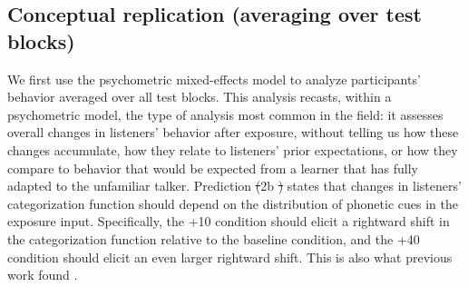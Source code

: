 \documentclass[
  11pt,
  man,mask,floatsintext]{apa6}
\makeatletter
\providecommand{\DIFdel}[1]{{\protect\color{red}\sout{#1}}} %
\providecommand{\DIFdelbegin}{} %
\providecommand{\DIFdelend}{} %
\newcommand{\DIFscaledelfig}{0.5}
\newlength{\DIFdelgraphicswidth} %
\newlength{\DIFdelgraphicsheight} %
\newcommand{\DIFdelincludegraphics}[2][]{%
\sbox{\DIFdelgraphicsbox}{\DIFOincludegraphics[#1]{#2}}%
\settoboxwidth{\DIFdelgraphicswidth}{\DIFdelgraphicsbox} %
\settoboxtotalheight{\DIFdelgraphicsheight}{\DIFdelgraphicsbox} %
\scalebox{\DIFscaledelfig}{%
\parbox[b]{\DIFdelgraphicswidth}{\usebox{\DIFdelgraphicsbox}\\[-\baselineskip] \rule{\DIFdelgraphicswidth}{0em}}\llap{\resizebox{\DIFdelgraphicswidth}{\DIFdelgraphicsheight}{%
\setlength{\unitlength}{\DIFdelgraphicswidth}%
\begin{picture}(1,1)%
\thicklines\linethickness{2pt} %
{\color[rgb]{1,0,0}\put(0,0){\framebox(1,1){}}}%
{\color[rgb]{1,0,0}\put(0,0){\line( 1,1){1}}}%
{\color[rgb]{1,0,0}\put(0,1){\line(1,-1){1}}}%
\end{picture}%
}\hspace*{3pt}}} %
} %
\DeclareRobustCommand{\DIFdelbegin}{\DIFOdelbegin \let\includegraphics\DIFdelincludegraphics} %
\DeclareRobustCommand{\DIFdelend}{\DIFOaddend \let\includegraphics\DIFOincludegraphics} %
\let\sout@orig\sout %
\renewcommand{\sout}[1]{\ifmmode\text{\sout@orig{\ensuremath{#1}}}\else\sout@orig{#1}\fi} %
\makeatother
\begin{document}
\subsection{Conceptual replication (averaging over test blocks)}\label{conceptual-replication-averaging-over-test-blocks}

We first use the psychometric mixed-effects model to analyze participants' behavior averaged over all test blocks. This analysis recasts, within a psychometric model, the type of analysis most common in the field: it assesses overall changes in listeners' behavior after exposure, without telling us how these changes accumulate, how they relate to listeners' prior expectations, or how they compare to behavior that would be expected from a learner that has fully adapted to the unfamiliar talker. Prediction \DIFdelbegin \DIFdel{(}\DIFdelend 2b \DIFdelbegin \DIFdel{) }\DIFdelend states that changes in listeners' categorization function should depend on the distribution of phonetic cues in the exposure input. Specifically, the +10 condition should elicit a rightward shift in the categorization function relative to the baseline condition, and the +40 condition should elicit an even larger rightward shift. This is also what previous work found \autocite{kleinschmidt-jaeger2016}.
\end{document}
